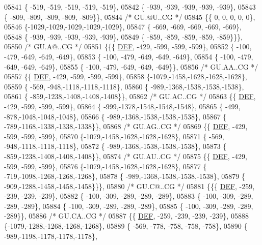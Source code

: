 \begin{DoxyCode}
05841 \{ -519, -519, -519, -519, -519\},
05842 \{ -939, -939, -939, -939, -939\},
05843 \{ -809, -809, -809, -809, -809\}\},
05844 \textcolor{comment}{/* GU.@U..CG */}
05845 \{\{    0,    0,    0,    0,    0\},
05846 \{-1029,-1029,-1029,-1029,-1029\},
05847 \{ -669, -669, -669, -669, -669\},
05848 \{ -939, -939, -939, -939, -939\},
05849 \{ -859, -859, -859, -859, -859\}\}\},
05850 \textcolor{comment}{/* GU.A@..CG */}
05851 \{\{\{  \mbox{\hyperlink{1_88_84__epars_8h_a397419fc12b37ed479c8abb9d444d843}{DEF}}, -429, -599, -599, -599\},
05852 \{ -100, -479, -649, -649, -649\},
05853 \{ -100, -479, -649, -649, -649\},
05854 \{ -100, -479, -649, -649, -649\},
05855 \{ -100, -479, -649, -649, -649\}\},
05856 \textcolor{comment}{/* GU.AA..CG */}
05857 \{\{  \mbox{\hyperlink{1_88_84__epars_8h_a397419fc12b37ed479c8abb9d444d843}{DEF}}, -429, -599, -599, -599\},
05858 \{-1079,-1458,-1628,-1628,-1628\},
05859 \{ -569, -948,-1118,-1118,-1118\},
05860 \{ -989,-1368,-1538,-1538,-1538\},
05861 \{ -859,-1238,-1408,-1408,-1408\}\},
05862 \textcolor{comment}{/* GU.AC..CG */}
05863 \{\{  \mbox{\hyperlink{1_88_84__epars_8h_a397419fc12b37ed479c8abb9d444d843}{DEF}}, -429, -599, -599, -599\},
05864 \{ -999,-1378,-1548,-1548,-1548\},
05865 \{ -499, -878,-1048,-1048,-1048\},
05866 \{ -989,-1368,-1538,-1538,-1538\},
05867 \{ -789,-1168,-1338,-1338,-1338\}\},
05868 \textcolor{comment}{/* GU.AG..CG */}
05869 \{\{  \mbox{\hyperlink{1_88_84__epars_8h_a397419fc12b37ed479c8abb9d444d843}{DEF}}, -429, -599, -599, -599\},
05870 \{-1079,-1458,-1628,-1628,-1628\},
05871 \{ -569, -948,-1118,-1118,-1118\},
05872 \{ -989,-1368,-1538,-1538,-1538\},
05873 \{ -859,-1238,-1408,-1408,-1408\}\},
05874 \textcolor{comment}{/* GU.AU..CG */}
05875 \{\{  \mbox{\hyperlink{1_88_84__epars_8h_a397419fc12b37ed479c8abb9d444d843}{DEF}}, -429, -599, -599, -599\},
05876 \{-1079,-1458,-1628,-1628,-1628\},
05877 \{ -719,-1098,-1268,-1268,-1268\},
05878 \{ -989,-1368,-1538,-1538,-1538\},
05879 \{ -909,-1288,-1458,-1458,-1458\}\}\},
05880 \textcolor{comment}{/* GU.C@..CG */}
05881 \{\{\{  \mbox{\hyperlink{1_88_84__epars_8h_a397419fc12b37ed479c8abb9d444d843}{DEF}}, -259, -239, -239, -239\},
05882 \{ -100, -309, -289, -289, -289\},
05883 \{ -100, -309, -289, -289, -289\},
05884 \{ -100, -309, -289, -289, -289\},
05885 \{ -100, -309, -289, -289, -289\}\},
05886 \textcolor{comment}{/* GU.CA..CG */}
05887 \{\{  \mbox{\hyperlink{1_88_84__epars_8h_a397419fc12b37ed479c8abb9d444d843}{DEF}}, -259, -239, -239, -239\},
05888 \{-1079,-1288,-1268,-1268,-1268\},
05889 \{ -569, -778, -758, -758, -758\},
05890 \{ -989,-1198,-1178,-1178,-1178\},

\end{DoxyCode}
